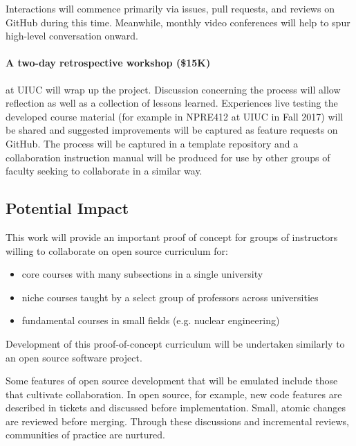 \documentclass[11pt]{article}
\begin{document}
          Interactions will commence primarily via issues, pull requests, and 
          reviews on GitHub during this time. Meanwhile, monthly video 
          conferences will help to spur high-level conversation onward.

          \paragraph{A two-day retrospective workshop (\$15K)} at UIUC will wrap up the 
          project. Discussion concerning the process will allow reflection as 
          well as a collection of lessons learned.
          Experiences live testing the developed course material (for example 
          in NPRE412 at UIUC in Fall 2017) will be shared and suggested 
          improvements will be captured as feature requests on GitHub.  
          The process will be captured in a template repository 
          and a collaboration instruction manual will be produced
          for use by other groups of faculty seeking to collaborate in a 
          similar way. 

          \subsection*{Potential Impact}
          
          This work will provide an important proof of concept for groups of 
          instructors willing to collaborate on open source curriculum for:
          \begin{itemize}
                  \item core courses with many subsections in a single university
                  \item niche courses taught by a select group of professors across 
          universities
                  \item fundamental courses in small fields (e.g. nuclear engineering)
          \end{itemize}

          Development of this proof-of-concept curriculum will be undertaken 
          similarly to an open source software project. 
          
          Some features of open source development that will be emulated 
          include those that cultivate collaboration. In open source, 
          for example, new code features are described in tickets and discussed 
          before implementation. Small, atomic changes are reviewed before 
          merging. Through these discussions and incremental reviews, communities of practice are nurtured.
\end{document}
